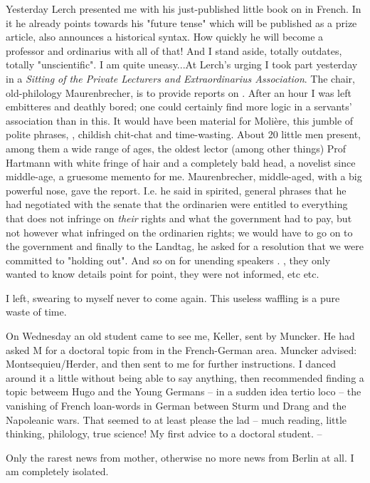 
Yesterday Lerch presented me with his just-published little book on  in French. In it he already points towards his "future tense" which will be published as a prize article, also announces a historical syntax. How quickly he will become a professor and ordinarius with all of that! And I stand aside, totally outdates, totally "unscientific". I am quite uneasy...At Lerch's urging I took part yesterday in a \textit{Sitting of the Private Lecturers and Extraordinarius Association}. The chair, old-philology Maurenbrecher, is to provide reports on . After an hour I was left embitteres and deathly bored; one could certainly find more logic in a servants' association than in this. It would have been material for Molière, this jumble of polite phrases, , childish chit-chat and time-wasting. About 20 little men present, among them a wide range of ages, the oldest lector (among other things) Prof Hartmann with white fringe of hair and a completely bald head, a novelist since middle-age, a gruesome memento for me. Maurenbrecher, middle-aged, with a big powerful nose, gave the report. I.e. he said in spirited, general phrases that he had negotiated with the senate that the ordinarien were entitled to everything that does not infringe on \textit{their} rights and what the government had to pay, but not however what infringed on the ordinarien rights; we would have to go on to the government and finally to the Landtag, he asked for a resolution that we were committed to "holding out". And so on for unending speakers . , they only wanted to know details point for point, they were not informed, etc etc. \missing

I left, swearing to myself never to come again. This useless waffling is a pure waste of time. \missing

On Wednesday an old student came to see me, Keller, sent by Muncker.  He had asked M for a doctoral topic from in the French-German area. Muncker advised: Montsequieu/Herder, and then sent to me for further instructions. I danced around it a little without being able to say anything, then recommended finding a topic betweem Hugo and the Young Germans -- in a sudden idea tertio loco -- the vanishing of French loan-words in German between Sturm und Drang and the Napoleanic wars. That seemed to at least please the lad -- much reading, little thinking, philology, true science! My first advice to a doctoral student. --

\missing

Only the rarest news from mother, otherwise no more news from Berlin at all. I am completely isolated.

\missing
